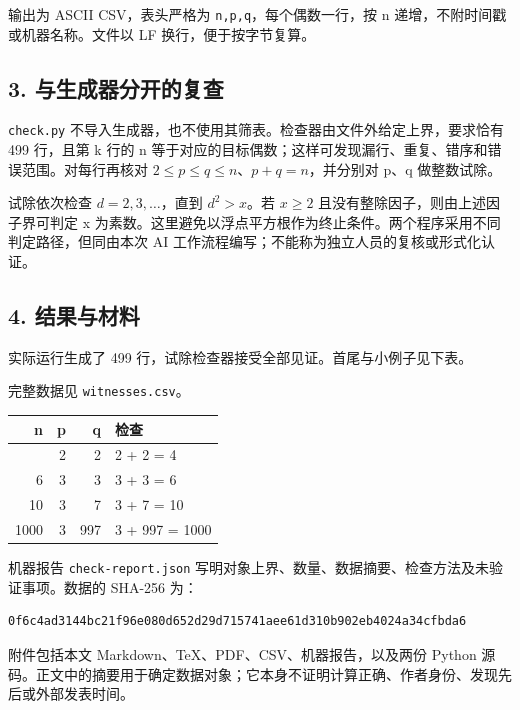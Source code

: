 \documentclass[
  11pt,
  fontset=fandol]{ctexart}
\newcounter{none} %
\begin{document}
输出为 ASCII CSV，表头严格为 \texttt{n,p,q}，每个偶数一行，按 n
递增，不附时间戳或机器名称。文件以 LF 换行，便于按字节复算。

\subsection{3.
与生成器分开的复查}\label{ux4e0eux751fux6210ux5668ux5206ux5f00ux7684ux590dux67e5}

\texttt{check.py}
不导入生成器，也不使用其筛表。检查器由文件外给定上界，要求恰有 499
行，且第 k 行的 n
等于对应的目标偶数；这样可发现漏行、重复、错序和错误范围。对每行再核对
\(2\leq p\leq q\leq n\)、\(p+q=n\)，并分别对 p、q 做整数试除。

试除依次检查 \(d=2,3,\ldots\)，直到 \(d^2>x\)。若 \(x\geq2\)
且没有整除因子，则由上述因子界可判定 x
为素数。这里避免以浮点平方根作为终止条件。两个程序采用不同判定路径，但同由本次
AI 工作流程编写；不能称为独立人员的复核或形式化认证。

\subsection{4. 结果与材料}\label{ux7ed3ux679cux4e0eux6750ux6599}

实际运行生成了 499 行，试除检查器接受全部见证。首尾与小例子见下表。

完整数据见 \texttt{witnesses.csv}。

{\def\LTcaptype{none} %
\begin{longtable}[]{@{}rrrl@{}}
\toprule\noalign{}
n & p & q & 检查 \\
\midrule\noalign{}
\endhead
\bottomrule\noalign{}
\endlastfoot
4 & 2 & 2 & 2 + 2 = 4 \\
6 & 3 & 3 & 3 + 3 = 6 \\
10 & 3 & 7 & 3 + 7 = 10 \\
1000 & 3 & 997 & 3 + 997 = 1000 \\
\end{longtable}
}

机器报告 \texttt{check-report.json}
写明对象上界、数量、数据摘要、检查方法及未验证事项。数据的 SHA-256 为：

\begin{verbatim}
0f6c4ad3144bc21f96e080d652d29d715741aee61d310b902eb4024a34cfbda6
\end{verbatim}

附件包括本文 Markdown、TeX、PDF、CSV、机器报告，以及两份 Python
源码。正文中的摘要用于确定数据对象；它本身不证明计算正确、作者身份、发现先后或外部发表时间。
\end{document}
